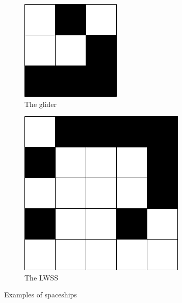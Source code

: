 \documentclass{l4proj}
\begin{document}
\begin{figure}[h]
\centering
\begin{subfigure}[b]{0.3\textwidth}
    \includegraphics[width=\textwidth]{dissertation/images/gol_structures/glider.png} 
    \caption{The glider}
    \label{fig:subim1}
\end{subfigure}
\hfill
\begin{subfigure}[b]{0.3\textwidth}
    \includegraphics[width=\textwidth]{dissertation/images/gol_structures/LWSS.png} 
    \caption{The LWSS}
    \label{fig:subim1}
\end{subfigure}

\caption{Examples of spaceships}
\end{figure}
\end{document}
